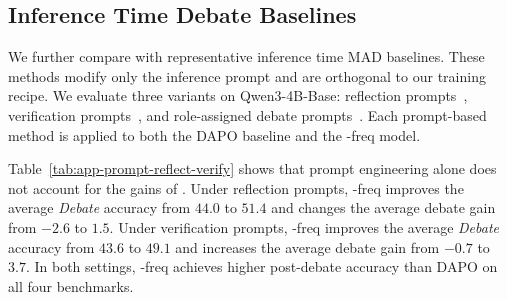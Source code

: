 \begin{table}[t]
  \caption{Open-ended summarization results on CNN/DailyMail. Round $0$ denotes direct generation before debate, while rounds $1$ and $2$ denote outputs after debate. Best results are bolded within each round and metric.}
  \label{tab:app-cnndm}
  \begin{center}
  \end{center}
  \vskip -0.1in
\end{table}


\subsection{Inference Time Debate Baselines}
\label{app:prompt_baselines}

We further compare \SDRL{} with representative inference time MAD baselines. These methods modify only the inference prompt and are orthogonal to our training recipe. We evaluate three variants on Qwen3-4B-Base: reflection prompts~\cite{huang2023large}, verification prompts~\cite{ling2023deductive}, and role-assigned debate prompts~\cite{liang2024encouraging}. Each prompt-based method is applied to both the DAPO baseline and the \SDRL{}-freq model.

Table~\ref{tab:app-prompt-reflect-verify} shows that prompt engineering alone does not account for the gains of \SDRL{}. Under reflection prompts, \SDRL{}-freq improves the average \textit{Debate} accuracy from $44.0$ to $51.4$ and changes the average debate gain from $-2.6$ to $1.5$. Under verification prompts, \SDRL{}-freq improves the average \textit{Debate} accuracy from $43.6$ to $49.1$ and increases the average debate gain from $-0.7$ to $3.7$. In both settings, \SDRL{}-freq achieves higher post-debate accuracy than DAPO on all four benchmarks.

